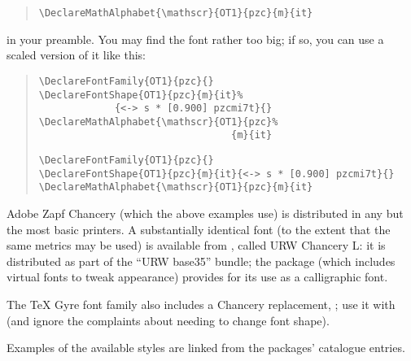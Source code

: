 \begin{description}
\begin{quote}
\begin{wideversion}
\begin{verbatim}
\DeclareMathAlphabet{\mathscr}{OT1}{pzc}{m}{it} 
\end{verbatim}
\end{wideversion}
\end{quote}
  in your preamble.  You may find the font rather too big; if so, you
  can use a scaled version of it like this:
\begin{quote}
\begin{narrowversion}
\begin{verbatim}
\DeclareFontFamily{OT1}{pzc}{}
\DeclareFontShape{OT1}{pzc}{m}{it}%
             {<-> s * [0.900] pzcmi7t}{}
\DeclareMathAlphabet{\mathscr}{OT1}{pzc}%
                                 {m}{it}
\end{verbatim}
\end{narrowversion}
\begin{wideversion}
\begin{verbatim}
\DeclareFontFamily{OT1}{pzc}{}
\DeclareFontShape{OT1}{pzc}{m}{it}{<-> s * [0.900] pzcmi7t}{}
\DeclareMathAlphabet{\mathscr}{OT1}{pzc}{m}{it}
\end{verbatim}
\end{wideversion}
\end{quote}
  Adobe Zapf Chancery (which the above examples use) is distributed in
  any but the most basic \PS{} printers.  A substantially identical
  font (to the extent that the same metrics may be used) is
  available from , called URW Chancery L: it is distributed
  as part of the ``URW base35'' bundle; the
   package (which includes virtual fonts to tweak
  appearance) provides for its use as a calligraphic font.

  The TeX Gyre font family also includes a Chancery replacement,
  ; use it with  (and ignore the
  complaints about needing to change font shape).
\end{description}
Examples of the available styles are linked from the packages'
catalogue entries.

